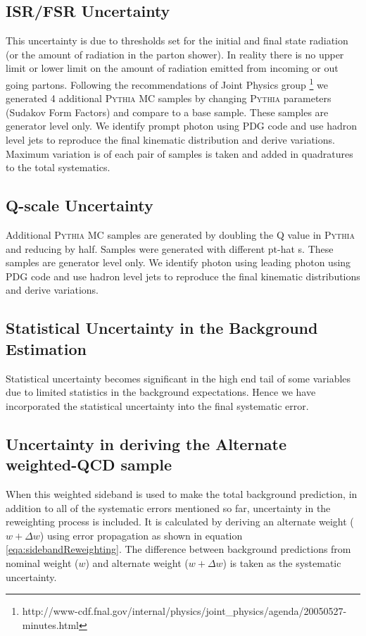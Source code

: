 \documentclass[11pt]{article}
\begin{document}
\subsection{ISR/FSR Uncertainty}
This uncertainty is due to thresholds set for the initial and final state radiation (or the amount of radiation in the parton shower). In reality there is no upper limit or lower limit on the amount of radiation emitted from incoming or out going partons. Following the recommendations of Joint Physics group \footnote{http://www-cdf.fnal.gov/internal/physics/joint\_physics/agenda/20050527-minutes.html} we generated 4 additional \textsc{Pythia} MC samples by changing \textsc{Pythia} parameters (Sudakov Form Factors) and compare to a base sample. These samples are generator level only. We identify prompt photon using PDG code and use hadron level jets to reproduce the  final kinematic distribution and derive variations. Maximum variation is of each pair of samples is taken and added in quadratures to the total systematics.

\subsection{Q-scale Uncertainty}
Additional \textsc{Pythia} MC samples are generated by doubling the Q value in \textsc{Pythia} and reducing by half. Samples were generated with different pt-hat s. These samples are generator level only. We identify photon using leading photon using PDG code and use hadron level jets to reproduce the  final kinematic distributions and derive variations.

\subsection{Statistical Uncertainty in the Background Estimation}
Statistical uncertainty becomes significant in the high end tail of some variables due to limited statistics in the background expectations. Hence we have incorporated the statistical uncertainty into the final systematic error.

\subsection{Uncertainty in deriving the Alternate weighted-QCD sample}
When this weighted sideband is used to make the total background prediction, in addition to all of the systematic errors mentioned so far, uncertainty in the reweighting process is included. It is calculated by deriving an alternate weight ($w+\Delta w$) using error propagation as shown in equation \ref{eqa:sidebandReweighting}. The difference between background predictions from nominal weight ($w$) and alternate weight ($w+\Delta w$) is taken as the systematic uncertainty.
\end{document}
